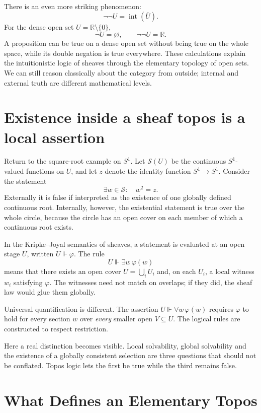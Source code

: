 There is an even more striking phenomenon:
\[
 \neg\neg U=\operatorname{int}(\overline U).
\]
For the dense open set \(U=\mathbb R\setminus\{0\}\),
\[
 \neg U=\varnothing,\qquad\neg\neg U=\mathbb R.
\]
A proposition can be true on a dense open set without being true on the whole space, while its double negation is true everywhere. These calculations explain the intuitionistic logic of sheaves through the elementary topology of open sets. We can still reason classically about the category from outside; internal and external truth are different mathematical levels.

\section{Existence inside a sheaf topos is a local assertion}

Return to the square-root example on \(S^1\). Let \(\mathcal S(U)\) be the continuous \(S^1\)-valued functions on \(U\), and let \(z\) denote the identity function \(S^1\to S^1\). Consider the statement
\[
 \exists w\in\mathcal S:\quad w^2=z.
\]
Externally it is false if interpreted as the existence of one globally defined continuous root. Internally, however, the existential statement is true over the whole circle, because the circle has an open cover on each member of which a continuous root exists.

In the Kripke--Joyal semantics of sheaves, a statement is evaluated at an open stage \(U\), written \(U\Vdash\varphi\). The rule
\[
 U\Vdash\exists w\,\varphi(w)
\]
means that there exists an open cover \(U=\bigcup_iU_i\) and, on each \(U_i\), a local witness \(w_i\) satisfying \(\varphi\). The witnesses need not match on overlaps; if they did, the sheaf law would glue them globally.

Universal quantification is different. The assertion \(U\Vdash\forall w\,\varphi(w)\) requires \(\varphi\) to hold for every section \(w\) over \emph{every} smaller open \(V\subseteq U\). The logical rules are constructed to respect restriction.

Here a real distinction becomes visible. Local solvability, global solvability and the existence of a globally consistent selection are three questions that should not be conflated. Topos logic lets the first be true while the third remains false.

\section{What Defines an Elementary Topos}

